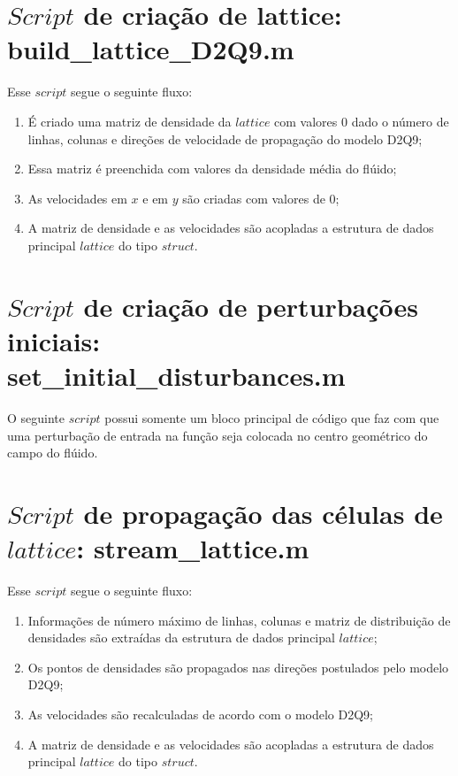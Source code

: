 \section{$Script$ de criação de lattice: build\_lattice\_D2Q9.m}
Esse $script$ segue o seguinte fluxo:
\begin{enumerate}
	\item É criado uma matriz de densidade da $lattice$ com valores 0 dado o número de linhas, colunas e direções de velocidade de propagação do modelo D2Q9;
	\item Essa matriz é preenchida com valores da densidade média do flúido;
	\item As velocidades em $x$ e em $y$ são criadas com valores de 0;
	\item A matriz de densidade e as velocidades são acopladas a estrutura de dados principal $lattice$ do tipo $struct$.
\end{enumerate}


\section{$Script$ de criação de perturbações iniciais: \\ set\_initial\_disturbances.m}
O seguinte $script$ possui somente um bloco principal de código que faz com que uma perturbação de entrada na função seja colocada no centro geométrico do campo do flúido.


\section{$Script$ de propagação das células de $lattice$: stream\_lattice.m}
Esse $script$ segue o seguinte fluxo:
\begin{enumerate}
	\item Informações de número máximo de linhas, colunas e matriz de distribuição de densidades são extraídas da estrutura de dados principal $lattice$;
	\item Os pontos de densidades são propagados nas direções postulados pelo modelo D2Q9;
	\item As velocidades são recalculadas de acordo com o modelo D2Q9;
	\item A matriz de densidade e as velocidades são acopladas a estrutura de dados principal $lattice$ do tipo $struct$.
\end{enumerate}


